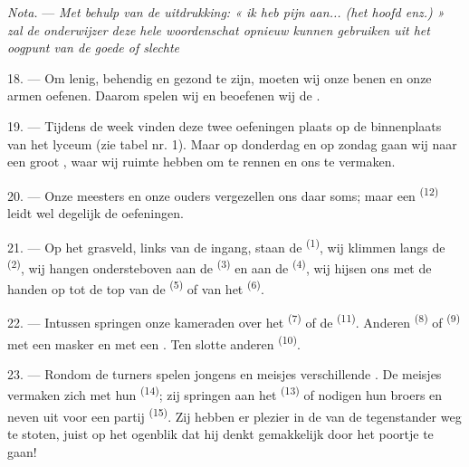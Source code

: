 \textit{Nota.} --- \textit{Met behulp van de uitdrukking: « ik heb pijn aan... (het hoofd
enz.) » zal de onderwijzer deze hele woordenschat opnieuw kunnen gebruiken uit het oogpunt van
de goede of slechte} 

\VUsaut{5.0mm}
\VUsaut{2.4mm}
\VUsaut{3.0mm}

18. --- Om lenig, behendig en gezond te zijn, moeten wij onze benen en onze armen oefenen.
Daarom spelen wij en beoefenen wij de .

19. --- Tijdens de week vinden deze twee oefeningen plaats op de binnenplaats van het lyceum
(zie tabel nr. 1). Maar op donderdag en op zondag gaan wij naar een groot ,
waar wij ruimte hebben om te rennen en ons te vermaken.

20. --- Onze meesters en onze ouders vergezellen ons daar soms; maar een
 \textsuperscript{(12)} leidt wel degelijk de
oefeningen.

21. --- Op het grasveld, links van de ingang, staan de
 \textsuperscript{(1)}, wij klimmen langs de
 \textsuperscript{(2)}, wij hangen ondersteboven aan de
 \textsuperscript{(3)} en aan de 
\textsuperscript{(4)}, wij hijsen ons met de handen op tot de top van de
 \textsuperscript{(5)} of van het 
\textsuperscript{(6)}.

22. --- Intussen springen onze kameraden over het  \textsuperscript{(7)}
of de  \textsuperscript{(11)}. Anderen 
\textsuperscript{(8)} of
 \textsuperscript{(9)} met een masker en met een
. Ten slotte  anderen 
\textsuperscript{(10)}.

\VUsaut{4.6mm}
\VUsaut{3.0mm}

23. --- Rondom de turners spelen jongens en meisjes verschillende
. De meisjes vermaken zich met hun 
\textsuperscript{(14)}; zij springen aan het  \textsuperscript{(13)} of nodigen
hun broers en neven uit voor een partij
 \textsuperscript{(15)}. Zij hebben er plezier in de
 van de tegenstander weg te stoten, juist op het ogenblik dat hij
denkt gemakkelijk door het poortje te gaan!

